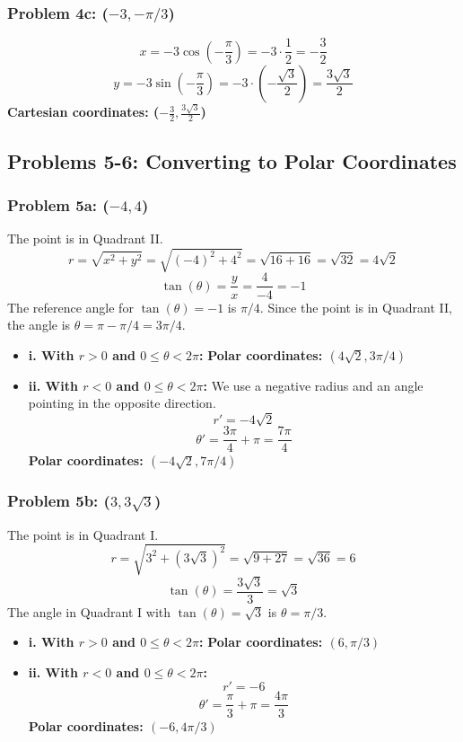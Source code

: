 \documentclass{article}
\begin{document}
\subsubsection*{Problem 4c: (\(-3, -\pi/3\))}
\[ x = -3 \cos\left(-\frac{\pi}{3}\right) = -3 \cdot \frac{1}{2} = -\frac{3}{2} \]
\[ y = -3 \sin\left(-\frac{\pi}{3}\right) = -3 \cdot \left(-\frac{\sqrt{3}}{2}\right) = \frac{3\sqrt{3}}{2} \]
\textbf{Cartesian coordinates: (\(-\frac{3}{2}, \frac{3\sqrt{3}}{2}\))}


\subsection*{Problems 5-6: Converting to Polar Coordinates}

\subsubsection*{Problem 5a: (\(-4, 4\))}
The point is in Quadrant II.
\[ r = \sqrt{x^2 + y^2} = \sqrt{(-4)^2 + 4^2} = \sqrt{16 + 16} = \sqrt{32} = 4\sqrt{2} \]
\[ \tan(\theta) = \frac{y}{x} = \frac{4}{-4} = -1 \]
The reference angle for \(\tan(\theta)=-1\) is \(\pi/4\). Since the point is in Quadrant II, the angle is \(\theta = \pi - \pi/4 = 3\pi/4\).

\begin{itemize}
    \item \textbf{i. With \(r > 0\) and \(0 \le \theta < 2\pi\):}
    \textbf{Polar coordinates: \((4\sqrt{2}, 3\pi/4)\)}
    \item \textbf{ii. With \(r < 0\) and \(0 \le \theta < 2\pi\):}
    We use a negative radius and an angle pointing in the opposite direction.
    \[ r' = -4\sqrt{2} \]
    \[ \theta' = \frac{3\pi}{4} + \pi = \frac{7\pi}{4} \]
    \textbf{Polar coordinates: \((-4\sqrt{2}, 7\pi/4)\)}
\end{itemize}

\subsubsection*{Problem 5b: (\(3, 3\sqrt{3}\))}
The point is in Quadrant I.
\[ r = \sqrt{3^2 + (3\sqrt{3})^2} = \sqrt{9 + 27} = \sqrt{36} = 6 \]
\[ \tan(\theta) = \frac{3\sqrt{3}}{3} = \sqrt{3} \]
The angle in Quadrant I with \(\tan(\theta)=\sqrt{3}\) is \(\theta = \pi/3\).

\begin{itemize}
    \item \textbf{i. With \(r > 0\) and \(0 \le \theta < 2\pi\):}
    \textbf{Polar coordinates: \((6, \pi/3)\)}
    \item \textbf{ii. With \(r < 0\) and \(0 \le \theta < 2\pi\):}
    \[ r' = -6 \]
    \[ \theta' = \frac{\pi}{3} + \pi = \frac{4\pi}{3} \]
    \textbf{Polar coordinates: \((-6, 4\pi/3)\)}
\end{itemize}
\end{document}

